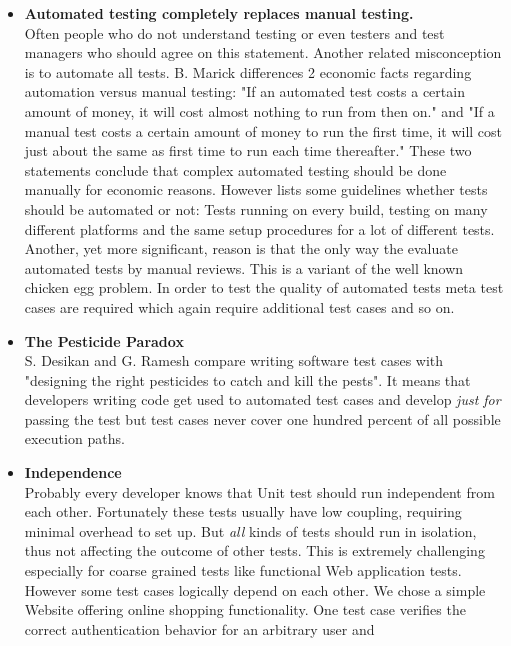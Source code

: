 \documentclass[12pt, notitlepage]{article}
\begin{document}
\begin{itemize}
	\item \textbf{Automated testing completely replaces manual testing.}\\
	Often people who do not understand testing or even testers and test managers who should agree on this statement. Another related misconception 
	is to automate all tests. B. Marick\cite{testing-mistakes} differences 2 economic facts regarding automation versus manual testing:
	"If an automated test costs a certain amount of money, it will cost almost nothing to run from then on." and
	"If a manual test costs a certain amount of money to run the first time, it will cost just about the same as first time to run each time thereafter."
	These two statements conclude that complex automated testing should be done manually for economic reasons.
	However \cite{test-automation-success} lists some guidelines whether tests should be automated or not: Tests running on every build,
	testing on many different platforms and the same setup procedures for a lot of different tests. \\
	Another, yet more significant, reason is that the only way the evaluate automated tests by manual reviews. This is a variant of the well known
	chicken egg problem. In order to test the quality of automated tests meta test cases are required which again require additional test cases and so on.
	\item \textbf{The Pesticide Paradox}\\
	S. Desikan and G. Ramesh\cite{softare-testing-principles} compare writing software test cases with "designing the right pesticides to catch and kill the pests".
	It means that developers writing code get used to automated test cases and develop \textit{just for} passing the test but test cases never cover one hundred 
	percent of all possible execution paths. 
	\item \textbf{Independence}\\
	Probably every developer knows that Unit test should run independent from each other. Fortunately these tests usually have low coupling, requiring minimal
	overhead to set up. But \textit{all} kinds of tests should run in isolation, thus not affecting the outcome of other tests.
	This is extremely challenging especially for coarse grained tests like functional Web application tests. However some test cases logically depend on each other.
	We chose a simple Website offering online shopping functionality. One test case verifies the correct authentication behavior for an arbitrary user and

\end{itemize}
\end{document}
